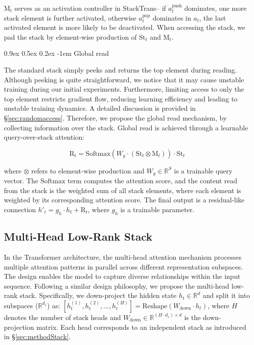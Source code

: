 \documentclass{article}
\makeatletter
\providecommand{\paragraph}{}
\renewcommand{\paragraph}[1]{%
  \@startsection{paragraph}{4}{\z@}%
                {0.9ex \@plus 0.5ex \@minus 0.2ex}%
                {-1em}%
                {\normalsize\bfseries}%
  {#1}
}
\DeclareRobustCommand{\method}{{\sc StackTrans}\xspace}
\makeatother
\begin{document}
\noindent $\text{M}_t$ serves as an activation controller in \method -- if $a_t^{\text{push}}$ dominates, one more stack element is further activated, otherwise $a_t^{\text{pop}}$ dominates in $a_t$, the last activated element is more likely to be deactivated.
When accessing the stack, we pad the stack by element-wise production of $\text{St}_t$ and $\text{M}_t$.


\paragraph{Global read}
\label{sec:globalreading}
The standard stack simply peeks and returns the top element during reading.
Although peeking is quite straightforward, we notice that it may cause unstable training during our initial experiments. 
Furthermore, limiting access to only the top element restricts gradient flow, reducing learning efficiency and leading to unstable training dynamics. A detailed discussion is provided in \S\ref{sec:randomaccess}.
Therefore, we propose the global read mechanism, by collecting information over the stack.
Global read is achieved through a learnable query-over-stack attention:


\vspace{-10pt}
\begin{equation}
    \text{R}_t=\text{Softmax}(W_g\cdot(\text{St}_t\otimes\text{M}_t))\cdot\text{St}_t
    \label{eq:gate_attention}
\end{equation}


\noindent where $\otimes$ refers to element-wise production and $W_g\in\mathbb{R}^{S}$ is a trainable query vector.
The $\text{Softmax}$ term computes the attention score, and the content read from the stack is the weighted sum of all stack elements, where each element is weighted by its corresponding attention score.
The final output is a residual-like connection $h'_t = g_{h} \cdot h_t+ \text{R}_t$, where $g_{h}$ is a trainable parameter.

\subsection{Multi-Head Low-Rank Stack}
\label{sec:multihead}

In the Transformer architecture, the multi-head attention mechanism \citep{vaswani2017attention} processes multiple attention patterns in parallel across different representation subspaces.
The design enables the model to capture diverse relationships within the input sequence.
Following a similar design philosophy, we propose the multi-head low-rank stack.
Specifically, we down-project the hidden state $h_t\in\mathbb{R}^d$ and split it into subspaces ($\mathbb{R}^{d_s}$) as:
$\left[ h^{(1)}_t, h^{(2)}_t, \ldots, h^{(H)}_t \right] = \text{Reshape}(W_{\mathrm{down}} \cdot h_t)$,
where $H$ denotes the number of stack heads and $W_\text{down}\in\mathbb{R}^{(H\cdot d_s)\times d}$ is the down-projection matrix.
Each head corresponds to an independent stack as introduced in \S\ref{sec:methodStack}. 
\end{document}
